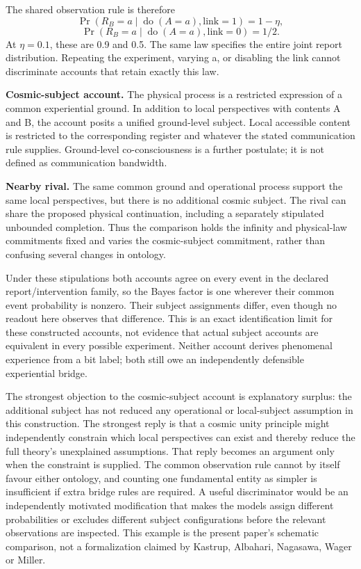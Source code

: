 \documentclass[
  10pt,
  a4paper,
]{article}
\begin{document}
The shared observation rule is therefore
\[\Pr(R_B=a\mid\operatorname{do}(A=a),\mathrm{link}=1)=1-\eta,\]
\[\Pr(R_B=a\mid\operatorname{do}(A=a),\mathrm{link}=0)=1/2.\] At
\(\eta=0.1\), these are 0.9 and 0.5. The same law specifies the entire
joint report distribution. Repeating the experiment, varying a, or
disabling the link cannot discriminate accounts that retain exactly this
law.

\textbf{Cosmic-subject account.} The physical process is a restricted
expression of a common experiential ground. In addition to local
perspectives with contents A and B, the account posits a unified
ground-level subject. Local accessible content is restricted to the
corresponding register and whatever the stated communication rule
supplies. Ground-level co-consciousness is a further postulate; it is
not defined as communication bandwidth.

\textbf{Nearby rival.} The same common ground and operational process
support the same local perspectives, but there is no additional cosmic
subject. The rival can share the proposed physical continuation,
including a separately stipulated unbounded completion. Thus the
comparison holds the infinity and physical-law commitments fixed and
varies the cosmic-subject commitment, rather than confusing several
changes in ontology.

Under these stipulations both accounts agree on every event in the
declared report/intervention family, so the Bayes factor is one wherever
their common event probability is nonzero. Their subject assignments
differ, even though no readout here observes that difference. This is an
exact identification limit for these constructed accounts, not evidence
that actual subject accounts are equivalent in every possible
experiment. Neither account derives phenomenal experience from a bit
label; both still owe an independently defensible experiential bridge.

The strongest objection to the cosmic-subject account is explanatory
surplus: the additional subject has not reduced any operational or
local-subject assumption in this construction. The strongest reply is
that a cosmic unity principle might independently constrain which local
perspectives can exist and thereby reduce the full theory's unexplained
assumptions. That reply becomes an argument only when the constraint is
supplied. The common observation rule cannot by itself favour either
ontology, and counting one fundamental entity as simpler is insufficient
if extra bridge rules are required. A useful discriminator would be an
independently motivated modification that makes the models assign
different probabilities or excludes different subject configurations
before the relevant observations are inspected. This example is the
present paper's schematic comparison, not a formalization claimed by
Kastrup, Albahari, Nagasawa, Wager or Miller.
\end{document}
